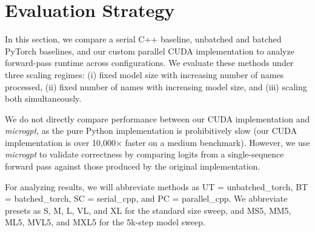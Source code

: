 \section{Evaluation Strategy}

In this section, we compare a serial C++ baseline, unbatched and batched PyTorch baselines, and our custom parallel CUDA implementation to analyze forward-pass runtime across configurations. We evaluate these methods under three scaling regimes: (i) fixed model size with increasing number of names processed, (ii) fixed number of names with increasing model size, and (iii) scaling both simultaneously.

We do not directly compare performance between our CUDA implementation and \textit{microgpt}, as the pure Python implementation is prohibitively slow (our CUDA implementation is over 10{,}000$\times$ faster on a medium benchmark). However, we use \textit{microgpt} to validate correctness by comparing logits from a single-sequence forward pass against those produced by the original implementation. 

For analyzing results, we will abbreviate methods as UT = unbatched\_torch, BT = batched\_torch, SC = serial\_cpp, and PC = parallel\_cpp. We abbreviate presets as S, M, L, VL, and XL for the standard size sweep, and MS5, MM5, ML5, MVL5, and MXL5 for the 5k-step model sweep.

